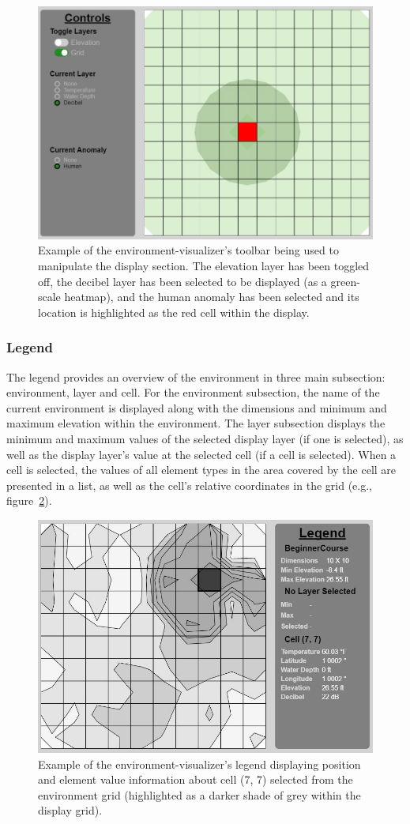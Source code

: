 \begin{figure}[!htb]
  \centering
  \includegraphics[width=0.725\columnwidth]{Figures/Visualizer/toolbar.JPG}
  \caption[GUI Visualization Toolbar]{Example of the environment-visualizer's toolbar being used to manipulate the display section. The elevation layer has been toggled off, the decibel layer has been selected to be displayed (as a green-scale heatmap), and the human anomaly has been selected and its location is highlighted as the red cell within the display.}
  \label{fig:toolbar}
\end{figure}

\subsubsection{Legend}
The legend provides an overview of the environment in three main subsection: environment, layer and cell.
For the environment subsection, the name of the current environment is displayed along with the dimensions and minimum and maximum elevation within the environment.
The layer subsection displays the minimum and maximum values of the selected display layer (if one is selected), as well as the display layer's value at the selected cell (if a cell is selected).
When a cell is selected, the values of all element types in the area covered by the cell are presented in a list, as well as the cell's relative coordinates in the grid (e.g., figure~\ref{fig:legend}).

\begin{figure}[!htb]
  \centering
  \includegraphics[width=0.725\columnwidth]{Figures/Visualizer/legend.JPG}
  \caption[GUI Visualizer Legend]{Example of the environment-visualizer's legend displaying position and element value information about cell (7, 7) selected from the environment grid (highlighted as a darker shade of grey within the display grid).}
  \label{fig:legend}
\end{figure}


